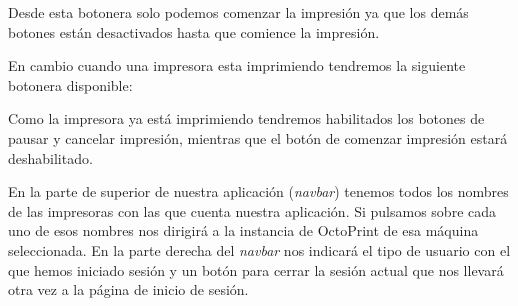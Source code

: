 Desde esta botonera solo podemos comenzar la impresión ya que los demás botones están desactivados hasta que comience la impresión.

En cambio cuando una impresora esta imprimiendo tendremos la siguiente botonera disponible:


Como la impresora ya está imprimiendo tendremos habilitados los botones de pausar y cancelar impresión, mientras que el botón de comenzar impresión estará deshabilitado.

En la parte de superior de nuestra aplicación (\textit{navbar}) tenemos todos los nombres de las impresoras con las que cuenta nuestra aplicación. Si pulsamos sobre cada uno de esos nombres nos dirigirá a la instancia de OctoPrint de esa máquina seleccionada. 
En la parte derecha del \textit{navbar} nos indicará el tipo de usuario con el que hemos iniciado sesión y un botón para cerrar la sesión actual que nos llevará otra vez a la página de inicio de sesión.






